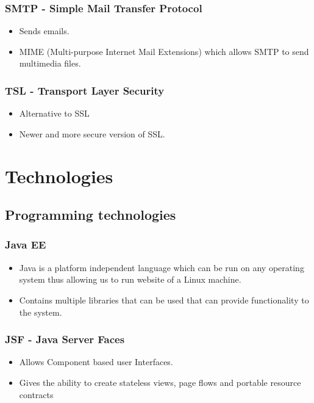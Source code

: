 \documentclass[12pt, oneside]{article}
\begin{document}
		\subsubsection{SMTP - Simple Mail Transfer Protocol}
			\begin{itemize}
				\item Sends emails.
				\item MIME (Multi-purpose Internet Mail Extensions) which allows SMTP to send multimedia files.
			\end{itemize}
		\subsubsection{TSL - Transport Layer Security}
			\begin{itemize}
				\item Alternative to SSL
				\item Newer and more secure version of SSL.
			\end{itemize}

		
\section{Technologies}
	\subsection{Programming technologies}
		\subsubsection{Java EE}
			\begin{itemize}
				\item Java is a platform independent language which can be run on any operating system thus allowing us to run website of a Linux machine.
				\item Contains multiple libraries that can be used that can provide functionality to the system. 
			\end{itemize}
			
		\subsubsection{JSF - Java Server Faces}
			\begin{itemize}
				\item Allows Component based user Interfaces.
				\item Gives the ability to create stateless views, page flows and portable resource contracts
			\end{itemize}
			
\end{document}
